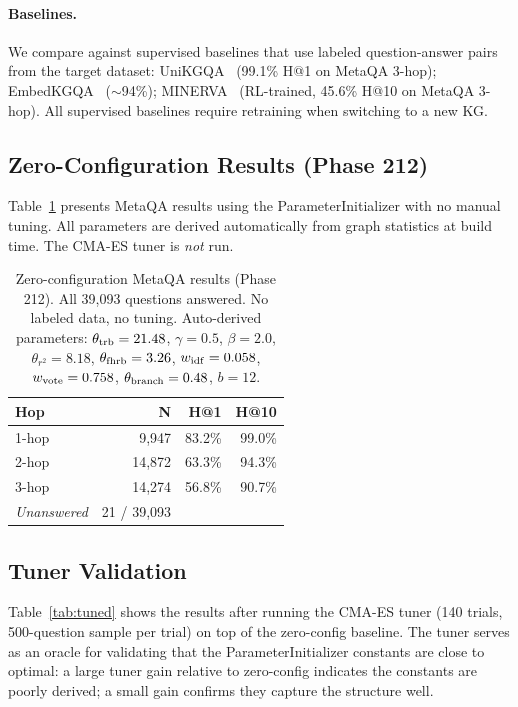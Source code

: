 \documentclass[11pt,a4paper]{article}
\begin{document}
\paragraph{Baselines.}
We compare against supervised baselines that use labeled question-answer
pairs from the target dataset:
UniKGQA~\cite{jiang2023unikgqa} (99.1\% H@1 on MetaQA 3-hop);
EmbedKGQA~\cite{saxena2020improving} ($\sim$94\%);
MINERVA~\cite{das2018go} (RL-trained, 45.6\% H@10 on MetaQA 3-hop).
All supervised baselines require retraining when switching to a new KG.

\subsection{Zero-Configuration Results (Phase 212)}

Table~\ref{tab:zero_config} presents MetaQA results using the
ParameterInitializer with no manual tuning.
All parameters are derived automatically from graph statistics at
build time. The CMA-ES tuner is \emph{not} run.

\begin{table}[t]
\centering
\caption{%
  Zero-configuration MetaQA results (Phase 212).
  All 39,093 questions answered. No labeled data, no tuning.
  Auto-derived parameters: $\theta_{\rm trb}=21.48$, $\gamma=0.5$,
  $\beta=2.0$, $\theta_{r^2}=8.18$, $\theta_{\rm fhrb}=3.26$,
  $w_{\rm idf}=0.058$, $w_{\rm vote}=0.758$,
  $\theta_{\rm branch}=0.48$, $b=12$.
}
\label{tab:zero_config}
\begin{tabular}{lrrr}
\toprule
\textbf{Hop} & \textbf{N} & \textbf{H@1} & \textbf{H@10} \\
\midrule
1-hop & 9,947 & 83.2\% & 99.0\% \\
2-hop & 14,872 & 63.3\% & 94.3\% \\
3-hop & 14,274 & 56.8\% & 90.7\% \\
\midrule
\textit{Unanswered} & 21 / 39,093 & \multicolumn{2}{c}{} \\
\bottomrule
\end{tabular}
\end{table}

\subsection{Tuner Validation}

Table~\ref{tab:tuned} shows the results after running the CMA-ES tuner
(140 trials, 500-question sample per trial) on top of the zero-config
baseline.
The tuner serves as an oracle for validating that the ParameterInitializer
constants are close to optimal: a large tuner gain relative to zero-config
indicates the constants are poorly derived; a small gain confirms they
capture the structure well.
\end{document}
